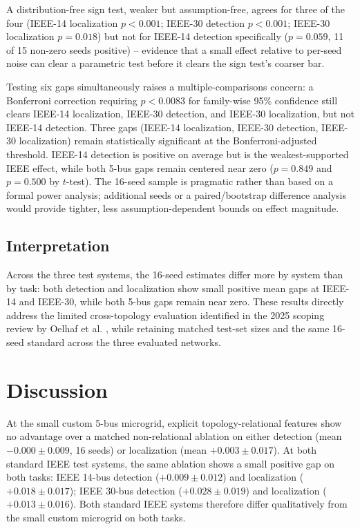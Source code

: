 \documentclass[conference]{IEEEtran}
\begin{document}
A distribution-free sign test, weaker but assumption-free, agrees for three of the four (IEEE-14 localization $p<0.001$; IEEE-30 detection $p<0.001$; IEEE-30 localization $p=0.018$) but not for IEEE-14 detection specifically ($p=0.059$, 11 of 15 non-zero seeds positive) -- evidence that a small effect relative to per-seed noise can clear a parametric test before it clears the sign test's coarser bar. 

Testing six gaps simultaneously raises a multiple-comparisons concern: a Bonferroni correction requiring $p<0.0083$ for family-wise 95\% confidence still clears IEEE-14 localization, IEEE-30 detection, and IEEE-30 localization, but not IEEE-14 detection. Three gaps (IEEE-14 localization, IEEE-30 detection, IEEE-30 localization) remain statistically significant at the Bonferroni-adjusted threshold. IEEE-14 detection is positive on average but is the weakest-supported IEEE effect, while both 5-bus gaps remain centered near zero ($p=0.849$ and $p=0.500$ by $t$-test). The 16-seed sample is pragmatic rather than based on a formal power analysis; additional seeds or a paired/bootstrap difference analysis would provide tighter, less assumption-dependent bounds on effect magnitude.

\subsection{Interpretation}
Across the three test systems, the 16-seed estimates differ more by system than by task: both detection and localization show small positive mean gaps at IEEE-14 and IEEE-30, while both 5-bus gaps remain near zero. These results directly address the limited cross-topology evaluation identified in the 2025 scoping review by Oelhaf et al. \cite{oelhaf2025scoping}, while retaining matched test-set sizes and the same 16-seed standard across the three evaluated networks.

\section{Discussion}

At the small custom 5-bus microgrid, explicit topology-relational features show no advantage over a matched non-relational ablation on either detection (mean $-0.000\pm0.009$, 16 seeds) or localization (mean $+0.003\pm0.017$). At both standard IEEE test systems, the same ablation shows a small positive gap on both tasks: IEEE 14-bus detection ($+0.009\pm0.012$) and localization ($+0.018\pm0.017$); IEEE 30-bus detection ($+0.028\pm0.019$) and localization ($+0.013\pm0.016$). Both standard IEEE systems therefore differ qualitatively from the small custom microgrid on both tasks.
\end{document}
